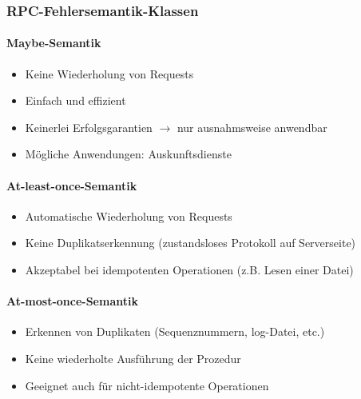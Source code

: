 \documentclass[10pt,a4paper]{article}
\begin{document}
\subsubsection{RPC-Fehlersemantik-Klassen}
\paragraph{Maybe-Semantik}
\begin{itemize}
\item Keine Wiederholung von Requests
\item Einfach und effizient
\item Keinerlei Erfolgsgarantien $\rightarrow$ nur ausnahmsweise anwendbar
\item Mögliche Anwendungen: Auskunftsdienste
\end{itemize}

\paragraph{At-least-once-Semantik}
\begin{itemize}
\item Automatische Wiederholung von Requests
\item Keine Duplikatserkennung (zustandsloses Protokoll auf Serverseite)
\item Akzeptabel bei idempotenten Operationen (z.B. Lesen einer Datei)
\end{itemize}

\paragraph{At-most-once-Semantik}
\begin{itemize}
\item Erkennen von Duplikaten (Sequenznummern, log-Datei, etc.)
\item Keine wiederholte Ausführung der Prozedur
\item Geeignet auch für nicht-idempotente Operationen
\end{itemize}
\end{document}
